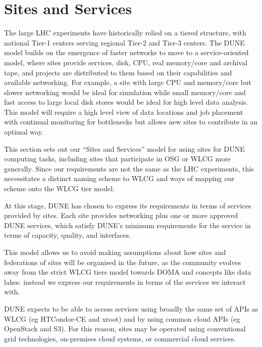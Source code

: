 \documentclass[../main-v1.tex]{subfiles}
\begin{document}
\section{Sites and Services }
\label{sec:cm:sites_and_services}  %


The large LHC experiments have historically relied on a tiered structure, with national Tier-1 centers serving regional Tier-2 and Tier-3 centers.  The DUNE model builds on the emergence of faster networks to move to  a service-oriented model, where sites provide services, disk, CPU, real memory/core and archival tape, and projects are  distributed to them based on their capabilities and available networking.  For example, a site with large CPU and memory/core but slower networking would be ideal for simulation while small memory/core and fast access to large local disk stores would be ideal for high level data analysis.  This model will require a high level view of data locations and job placement with continual monitoring for bottlenecks but allows new sites to contribute in an optimal way. 

This section sets out our ``Sites and Services'' model for using sites for DUNE computing tasks, including sites that participate in OSG or WLCG more generally. Since our requirements are not the same as the LHC experiments, this necessitates a distinct naming scheme to WLCG and ways of mapping our scheme onto the WLCG tier model.

At this stage, DUNE has chosen to express its requirements in terms of services provided by sites. Each site provides networking plus one or more approved DUNE services, which satisfy DUNE's minimum requirements for the service in terms of capacity, quality, and interfaces.

This model allows us to avoid making assumptions about how sites and federations of sites will be organised in the future, as the community evolves away from the strict WLCG tiers model towards DOMA and concepts like data lakes: instead we express our requirements in terms of the services we interact with.

DUNE expects to be able to access services using broadly the same set of APIs as WLCG (eg HTCondor-CE and xroot) and by using common cloud APIs (eg OpenStack and S3). For this reason, sites may be operated using conventional grid technologies, on-premises cloud systems, or commercial cloud services.
\end{document}
